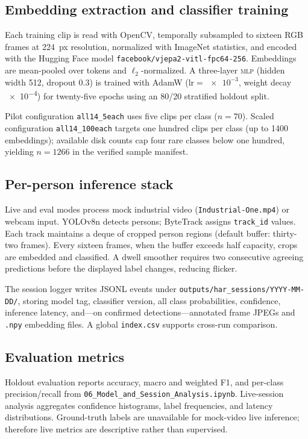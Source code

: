 \subsection{Embedding extraction and classifier training}

Each training clip is read with OpenCV, temporally subsampled to sixteen RGB frames at \SI{224}{px} resolution, normalized with ImageNet statistics, and encoded with the Hugging Face model \texttt{facebook/vjepa2-vitl-fpc64-256}.
Embeddings are mean-pooled over tokens and $\ell_2$-normalized.
A three-layer \textsc{mlp} (hidden width \num{512}, dropout \num{0.3}) is trained with AdamW ($\text{lr}=\num{e-3}$, weight decay \num{e-4}) for twenty-five epochs using an \num{80}/\num{20} stratified holdout split.

Pilot configuration \texttt{all14\_5each} uses five clips per class ($n=\num{70}$).
Scaled configuration \texttt{all14\_100each} targets one hundred clips per class (up to \num{1400} embeddings); available disk counts cap four rare classes below one hundred, yielding $n=\num{1266}$ in the verified sample manifest.

\subsection{Per-person inference stack}

Live and eval modes process mock industrial video (\texttt{Industrial-One.mp4}) or webcam input.
YOLOv8n detects persons; ByteTrack assigns \texttt{track\_id} values.
Each track maintains a deque of cropped person regions (default buffer: thirty-two frames).
Every sixteen frames, when the buffer exceeds half capacity, crops are embedded and classified.
A dwell smoother requires two consecutive agreeing predictions before the displayed label changes, reducing flicker.

The \har{} session logger writes JSONL events under \texttt{outputs/har\_sessions/YYYY-MM-DD/}, storing model tag, classifier version, all class probabilities, confidence, inference latency, and---on confirmed detections---annotated frame JPEGs and \texttt{.npy} embedding files.
A global \texttt{index.csv} supports cross-run comparison.

\subsection{Evaluation metrics}

Holdout evaluation reports accuracy, macro and weighted F1, and per-class precision/recall from \texttt{06\_Model\_and\_Session\_Analysis.ipynb}.
Live-session analysis aggregates confidence histograms, label frequencies, and latency distributions.
Ground-truth labels are unavailable for mock-video live inference; therefore live metrics are descriptive rather than supervised.
